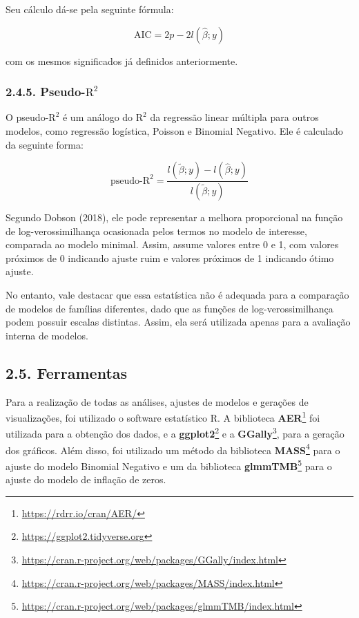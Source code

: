 \documentclass[
]{article}
\begin{document}
Seu cálculo dá-se pela seguinte fórmula:

\[
\text{AIC} = 2p - 2l(\hat{\beta}; y)
\]

com os mesmos significados já definidos anteriormente.

\subsubsection{\texorpdfstring{2.4.5.
Pseudo-\(\text{R}^2\)}{2.4.5. Pseudo-\textbackslash text\{R\}\^{}2}}\label{pseudo-textr2}

O pseudo-\(\text{R}^2\) é um análogo do \(\text{R}^2\) da regressão
linear múltipla para outros modelos, como regressão logística, Poisson e
Binomial Negativo. Ele é calculado da seguinte forma:

\[
\text{pseudo-R}^2 = \dfrac{l(\tilde{\beta}; y) - l(\hat{\beta}; y)}{l(\tilde{\beta}; y)}
\]

Segundo Dobson (2018), ele pode representar a melhora proporcional na
função de log-verossimilhança ocasionada pelos termos no modelo de
interesse, comparada ao modelo minimal. Assim, assume valores entre 0 e
1, com valores próximos de 0 indicando ajuste ruim e valores próximos de
1 indicando ótimo ajuste.

No entanto, vale destacar que essa estatística não é adequada para a
comparação de modelos de famílias diferentes, dado que as funções de
log-verossimilhança podem possuir escalas distintas. Assim, ela será
utilizada apenas para a avaliação interna de modelos.

\subsection{2.5. Ferramentas}\label{ferramentas}

Para a realização de todas as análises, ajustes de modelos e gerações de
visualizações, foi utilizado o software estatístico R. A biblioteca
\textbf{AER}\footnote{\url{https://rdrr.io/cran/AER/}} foi utilizada
para a obtenção dos dados, e a \textbf{ggplot2}\footnote{\url{https://ggplot2.tidyverse.org}}
e a \textbf{GGally}\footnote{\url{https://cran.r-project.org/web/packages/GGally/index.html}},
para a geração dos gráficos. Além disso, foi utilizado um método da
biblioteca \textbf{MASS}\footnote{\url{https://cran.r-project.org/web/packages/MASS/index.html}}
para o ajuste do modelo Binomial Negativo e um da biblioteca
\textbf{glmmTMB}\footnote{\url{https://cran.r-project.org/web/packages/glmmTMB/index.html}}
para o ajuste do modelo de inflação de zeros.
\end{document}

